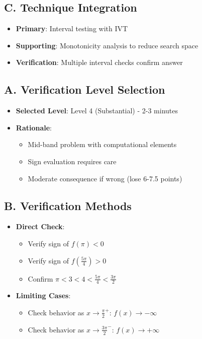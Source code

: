 \documentclass[]{article}
\begin{document}
\begin{techniquesbox}
\subsection*{C. Technique Integration}
\begin{itemize}[leftmargin=*]
    \item \textbf{Primary}: Interval testing with IVT
    \item \textbf{Supporting}: Monotonicity analysis to reduce search space
    \item \textbf{Verification}: Multiple interval checks confirm answer
\end{itemize}
\end{techniquesbox}

\begin{verificationbox}
\subsection*{A. Verification Level Selection}
\begin{itemize}[leftmargin=*]
    \item \textbf{Selected Level}: Level 4 (Substantial) - 2-3 minutes
    \item \textbf{Rationale}:
    \begin{itemize}
        \item Mid-band problem with computational elements
        \item Sign evaluation requires care
        \item Moderate consequence if wrong (lose 6-7.5 points)
    \end{itemize}
\end{itemize}

\subsection*{B. Verification Methods}
\begin{itemize}[leftmargin=*]
    \item \textbf{Direct Check}: 
    \begin{itemize}
        \item Verify sign of $f(\pi) < 0$
        \item Verify sign of $f(\frac{5\pi}{4}) > 0$
        \item Confirm $\pi < 3 < 4 < \frac{5\pi}{4} < \frac{3\pi}{2}$
    \end{itemize}
    
    \item \textbf{Limiting Cases}:
    \begin{itemize}
        \item Check behavior as $x \to \frac{\pi}{2}^+$: $f(x) \to -\infty$
        \item Check behavior as $x \to \frac{3\pi}{2}^-$: $f(x) \to +\infty$
    \end{itemize}
    

\end{itemize}
\end{verificationbox}
\end{document}
